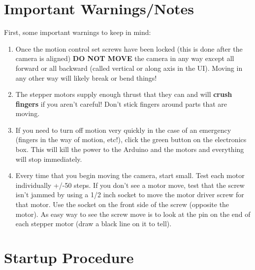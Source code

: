\documentclass[11pt]{article}
\begin{document}
\section{Important Warnings/Notes}

First, some important warnings to keep in mind:
\begin{enumerate}
	\item Once the motion control set screws have been locked (this is done after the camera is aligned) {\bf DO NOT MOVE} the camera in any way except all forward or all backward (called vertical or along axis in the UI).
	Moving in any other way will likely break or bend things!
	\item The stepper motors supply enough thrust that they can and will {\bf crush fingers} if you aren't careful!  Don't stick fingers around parts that are moving.
	\item If you need to turn off motion very quickly in the case of an emergency (fingers in the way of motion, etc!), click the green button on the electronics box.
		 This will kill the power to the Arduino and the motors and everything will stop immediately.
	\item Every time that you begin moving the camera, start small.  Test each motor individually +/-50 steps.  
		If you don't see a motor move, test that the screw isn't jammed by using a 1/2 inch socket to move the motor driver screw for that motor.
		Use the socket on the front side of the screw (opposite the motor).
		As easy way to see the screw move is to look at the pin on the end of each stepper motor (draw a black line on it to tell).
\end{enumerate}


\section{Startup Procedure}
\end{document}
